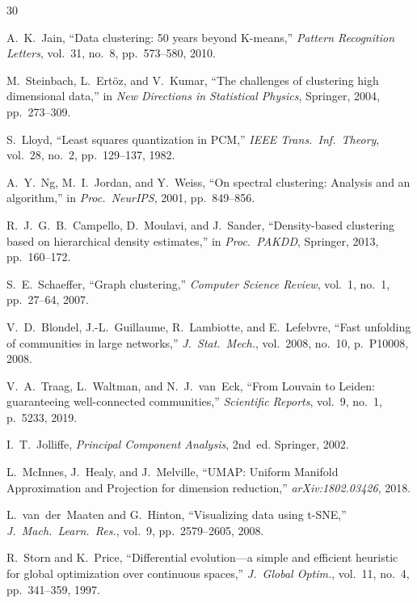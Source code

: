 \documentclass[journal]{IEEEtran}
\begin{document}
\begin{thebibliography}{30}

A.~K.~Jain, ``Data clustering: 50 years beyond K-means,'' \emph{Pattern Recognition Letters}, vol.~31, no.~8, pp.~573--580, 2010.

M.~Steinbach, L.~Ert\"{o}z, and V.~Kumar, ``The challenges of clustering high dimensional data,'' in \emph{New Directions in Statistical Physics}, Springer, 2004, pp.~273--309.

S.~Lloyd, ``Least squares quantization in PCM,'' \emph{IEEE Trans.\ Inf.\ Theory}, vol.~28, no.~2, pp.~129--137, 1982.

A.~Y.~Ng, M.~I.~Jordan, and Y.~Weiss, ``On spectral clustering: Analysis and an algorithm,'' in \emph{Proc.\ NeurIPS}, 2001, pp.~849--856.

R.~J.~G.~B.~Campello, D.~Moulavi, and J.~Sander, ``Density-based clustering based on hierarchical density estimates,'' in \emph{Proc.\ PAKDD}, Springer, 2013, pp.~160--172.

S.~E.~Schaeffer, ``Graph clustering,'' \emph{Computer Science Review}, vol.~1, no.~1, pp.~27--64, 2007.

V.~D.~Blondel, J.-L.~Guillaume, R.~Lambiotte, and E.~Lefebvre, ``Fast unfolding of communities in large networks,'' \emph{J.\ Stat.\ Mech.}, vol.~2008, no.~10, p.~P10008, 2008.

V.~A.~Traag, L.~Waltman, and N.~J.~van~Eck, ``From Louvain to Leiden: guaranteeing well-connected communities,'' \emph{Scientific Reports}, vol.~9, no.~1, p.~5233, 2019.

I.~T.~Jolliffe, \emph{Principal Component Analysis}, 2nd~ed. Springer, 2002.

L.~McInnes, J.~Healy, and J.~Melville, ``UMAP: Uniform Manifold Approximation and Projection for dimension reduction,'' \emph{arXiv:1802.03426}, 2018.

L.~van~der~Maaten and G.~Hinton, ``Visualizing data using t-SNE,'' \emph{J.\ Mach.\ Learn.\ Res.}, vol.~9, pp.~2579--2605, 2008.

R.~Storn and K.~Price, ``Differential evolution---a simple and efficient heuristic for global optimization over continuous spaces,'' \emph{J.\ Global Optim.}, vol.~11, no.~4, pp.~341--359, 1997.


\end{thebibliography}
\end{document}
